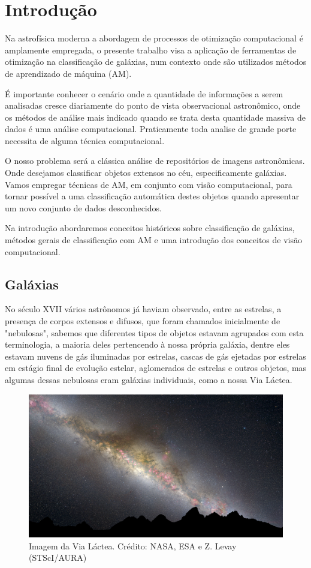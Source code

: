 \chapter{Introdução} 

Na astrofísica moderna a abordagem de processos de otimização computacional é amplamente empregada, o presente trabalho visa a aplicação de ferramentas de otimização na classificação de galáxias, num contexto onde são utilizados métodos de aprendizado de máquina (AM).  

É importante conhecer o cenário onde a quantidade de informações a serem analisadas cresce diariamente do ponto de vista observacional astronômico, onde os métodos de análise mais indicado quando se trata desta quantidade massiva de dados é uma análise computacional. Praticamente toda analise de grande porte necessita de alguma técnica computacional. 

O nosso problema será a clássica análise de repositórios de imagens astronômicas. Onde desejamos classificar objetos extensos no céu, especificamente galáxias. Vamos empregar técnicas de AM, em conjunto com visão computacional, para tornar possível a uma classificação automática destes objetos quando apresentar um novo conjunto de dados desconhecidos. 

Na introdução abordaremos conceitos históricos sobre classificação de galáxias, métodos gerais de classificação com AM e uma introdução dos conceitos de visão computacional. 

\section{Galáxias} 

No século XVII vários astrônomos já haviam observado, entre as estrelas, a presença de corpos extensos e difusos, que foram chamados inicialmente de "nebulosas", sabemos que diferentes tipos de objetos estavam agrupados com esta terminologia, a maioria  deles pertencendo à nossa própria galáxia, dentre eles estavam nuvens de gás iluminadas por estrelas, cascas de gás ejetadas por estrelas em estágio final de evolução estelar, aglomerados de estrelas e outros objetos, mas algumas dessas nebulosas eram galáxias individuais, como a nossa Via Láctea. 

\begin{figure}[ht!] 
\centering 
\includegraphics[width=15cm]{imagens/xlarge_web.jpg} 
\caption{Imagem da Via Láctea. Crédito: NASA, ESA e Z. Levay (STScI/AURA)} 
\label{fig:ViaLactea} 
\end{figure} 

